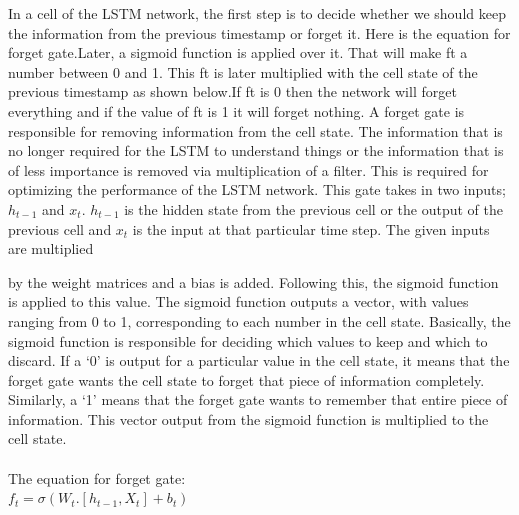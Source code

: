 \documentclass[openany,12pt]{report}
\begin{document}
\begin{itemize}
In a cell of the LSTM network, the first step is to decide whether we should keep the information from the previous timestamp or forget it. Here is the equation for forget gate.Later, a sigmoid function is applied over it. That will make ft a number between 0 and 1. This ft is later multiplied with the cell state of the previous timestamp as shown below.If ft is 0 then the network will forget everything and if the value of ft is 1 it will forget nothing.
A forget gate is responsible for removing information from the cell state. The information that is no longer required for the LSTM to understand things or the information that is of less importance is removed via multiplication of a filter. This is required for optimizing the performance of the LSTM network.
This gate takes in two inputs; $h_{t-1}$ and $x_t$. $h_{t-1}$ is the hidden state from the previous cell or the output of the previous cell and $x_t$ is the input at that particular time step. The given inputs are multiplied 

by the weight matrices and a bias is added. Following this, the sigmoid function is applied to this value. The sigmoid function outputs a vector, with values ranging from 0 to 1, corresponding to each number in the cell state. Basically, the sigmoid function is responsible for deciding which values to keep and which to discard. If a ‘0’ is output for a particular value in the cell state, it means that the forget gate wants the cell state to forget that piece of information completely. Similarly, a ‘1’ means that the forget gate wants to remember that entire piece of information. This vector output from the sigmoid function is multiplied to the cell state.\\
\\
The equation for forget gate:\\


$f_{t}=\sigma(W_{t}.[h_{t-1},X_{t}]+b_{t})$
\\


\end{itemize}
\end{document}
